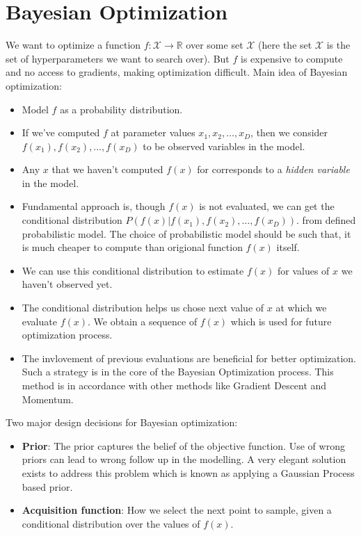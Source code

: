 \section{Bayesian Optimization}\label{sec:bo}
We want to optimize a function $f : \mathcal{X} \to \mathbb{R}$ over some set $\mathcal{X}$ (here the set $\mathcal{X}$ is the set of hyperparameters we want to search over). But $f$ is expensive to compute and no access to gradients, making optimization difficult\cite{cs4787}. Main idea of Bayesian optimization:
\begin{itemize}
	\item Model $f$ as a probability distribution.
	\item If we’ve computed $f$ at parameter values $x_1, x_2, \dots , x_D$, then we consider\\ $f (x_1), f(x_2), \dots , f(x_D)$ to be observed variables in the model.
	\item Any $x$ that we haven’t computed $f(x)$ for corresponds to a \textit{hidden variable} in the model.
	\item Fundamental approach is, though $f(x)$ is not evaluated, we can get the conditional distribution  $ P(f(x)|f(x_1), f(x_2), \dots , f(x_D)). $ from defined probabilistic model. The choice of probabilistic model should be such that, it is much cheaper to compute than origional function $f(x)$ itself.
	\item We can use this conditional distribution to estimate $f(x)$ for values of $x$ we haven’t observed yet.
	\item The conditional distribution helps us chose next value of $x$ at which we evaluate $f(x)$. We obtain a sequence of $f(x)$ which is used for future optimization process.
	\item The invlovement of previous evaluations are beneficial for better optimization. Such a strategy is in the core of the Bayesian Optimization process. This method is in accordance with other methods like Gradient Descent and Momentum.
\end{itemize}
Two major design decisions for Bayesian optimization:
\begin{itemize}
	\item \textbf{Prior}: The prior captures the belief of the objective function. Use of wrong priors can lead to wrong follow up in the modelling. A very elegant solution exists to address this problem which is known as applying a Gaussian Process based prior.
	\item \textbf{Acquisition function}: How we select the next point to sample, given a conditional distribution over the values of $f(x)$. 
\end{itemize}

